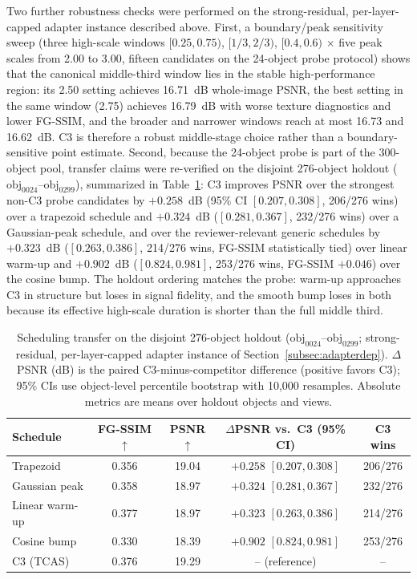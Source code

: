 \documentclass[times,twocolumn,final]{elsarticle}
\begin{document}
Two further robustness checks were performed on the strong-residual, per-layer-capped adapter instance described above. First, a boundary/peak sensitivity sweep (three high-scale windows $[0.25,0.75)$, $[1/3,2/3)$, $[0.4,0.6)$ $\times$ five peak scales from 2.00 to 3.00, fifteen candidates on the 24-object probe protocol) shows that the canonical middle-third window lies in the stable high-performance region: its 2.50 setting achieves 16.71~dB whole-image PSNR, the best setting in the same window (2.75) achieves 16.79~dB with worse texture diagnostics and lower FG-SSIM, and the broader and narrower windows reach at most 16.73 and 16.62~dB. C3 is therefore a robust middle-stage choice rather than a boundary-sensitive point estimate. Second, because the 24-object probe is part of the 300-object pool, transfer claims were re-verified on the disjoint 276-object holdout ($\mathrm{obj}_{0024}$--$\mathrm{obj}_{0299}$), summarized in Table~\ref{tab:holdoutsched}: C3 improves PSNR over the strongest non-C3 probe candidates by $+0.258$~dB (95\% CI $[0.207,0.308]$, 206/276 wins) over a trapezoid schedule and $+0.324$~dB ($[0.281,0.367]$, 232/276 wins) over a Gaussian-peak schedule, and over the reviewer-relevant generic schedules by $+0.323$~dB ($[0.263,0.386]$, 214/276 wins, FG-SSIM statistically tied) over linear warm-up and $+0.902$~dB ($[0.824,0.981]$, 253/276 wins, FG-SSIM $+0.046$) over the cosine bump. The holdout ordering matches the probe: warm-up approaches C3 in structure but loses in signal fidelity, and the smooth bump loses in both because its effective high-scale duration is shorter than the full middle third.

\begin{table}[t]
\centering
\caption{Scheduling transfer on the disjoint 276-object holdout ($\mathrm{obj}_{0024}$--$\mathrm{obj}_{0299}$; strong-residual, per-layer-capped adapter instance of Section~\ref{subsec:adapterdep}). $\Delta$PSNR (dB) is the paired C3-minus-competitor difference (positive favors C3); 95\% CIs use object-level percentile bootstrap with 10{,}000 resamples. Absolute metrics are means over holdout objects and views.}
\label{tab:holdoutsched}
\footnotesize\setlength{\tabcolsep}{2.5pt}
\begin{tabular}{lcccc}
\toprule
Schedule & FG-SSIM$\uparrow$ & PSNR$\uparrow$ & $\Delta$PSNR vs.\ C3 (95\% CI) & C3 wins \\
\midrule
Trapezoid & 0.356 & 19.04 & $+0.258$ $[0.207, 0.308]$ & 206/276 \\
Gaussian peak & 0.358 & 18.97 & $+0.324$ $[0.281, 0.367]$ & 232/276 \\
Linear warm-up & 0.377 & 18.97 & $+0.323$ $[0.263, 0.386]$ & 214/276 \\
Cosine bump & 0.330 & 18.39 & $+0.902$ $[0.824, 0.981]$ & 253/276 \\
C3 (TCAS) & 0.376 & 19.29 & -- (reference) & -- \\
\bottomrule
\end{tabular}
\end{table}
\end{document}
